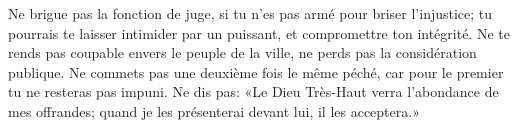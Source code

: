 Ne brigue pas la fonction de juge, si tu n’es pas armé pour briser l’injustice;
	tu pourrais te laisser intimider par un puissant, et compromettre ton intégrité.
Ne te rends pas coupable envers le peuple de la ville,
	ne perds pas la considération publique.
Ne commets pas une deuxième fois le même péché,
	car pour le premier tu ne resteras pas impuni.
Ne dis pas: «Le Dieu Très-Haut verra l’abondance de mes offrandes;
	quand je les présenterai devant lui, il les acceptera.»

